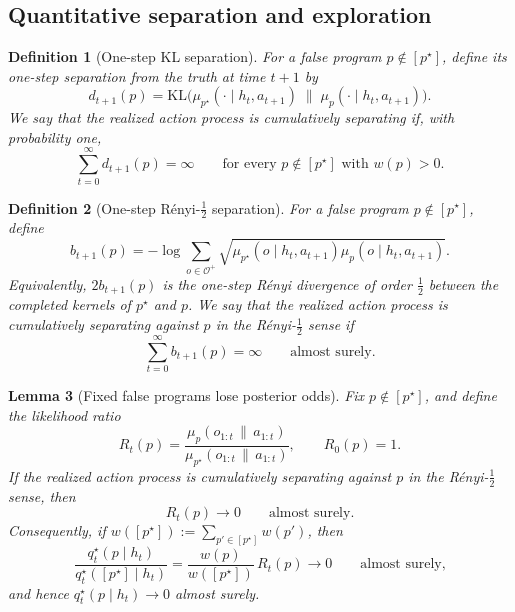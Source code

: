 \documentclass[11pt]{article}
\newtheorem{definition}{Definition}[section]
\newtheorem{lemma}[definition]{Lemma}
\theoremstyle{remark}
\newcommand{\Ocal}{\mathcal{O}}
\newcommand{\KL}{\mathrm{KL}}
\newcommand{\givena}{\,\|\,}
\begin{document}
\subsection{Quantitative separation and exploration}

\begin{definition}[One-step KL separation]
For a false program \(p \notin [p^\star]\), define its one-step separation from the truth at time \(t+1\) by
\[
d_{t+1}(p)
= \KL\bigl(
\mu_{p^\star}(\cdot\mid h_t,a_{t+1})
\;\|\;
\mu_p(\cdot\mid h_t,a_{t+1})
\bigr).
\]
We say that the realized action process is \emph{cumulatively separating} if, with probability one,
\[
\sum_{t=0}^{\infty} d_{t+1}(p) = \infty
\qquad\text{for every } p \notin [p^\star] \text{ with } w(p)>0.
\]
\end{definition}

\begin{definition}[One-step R\'enyi-\(\frac12\) separation]
\label{def:renyi-separation}
For a false program \(p \notin [p^\star]\), define
\[
b_{t+1}(p)
= -\log \sum_{o \in \Ocal^+}
\sqrt{
\mu_{p^\star}(o\mid h_t,a_{t+1})
\mu_p(o\mid h_t,a_{t+1})
}.
\]
Equivalently, \(2b_{t+1}(p)\) is the one-step R\'enyi divergence of order \(\frac12\) between the completed kernels of \(p^\star\) and \(p\). We say that the realized action process is \emph{cumulatively separating against \(p\) in the R\'enyi-\(\frac12\) sense} if
\[
\sum_{t=0}^{\infty} b_{t+1}(p) = \infty
\qquad\text{almost surely.}
\]
\end{definition}

\begin{lemma}[Fixed false programs lose posterior odds]
\label{lem:fixed-false-program}
Fix \(p \notin [p^\star]\), and define the likelihood ratio
\[
R_t(p)
= \frac{\mu_p(o_{1:t}\givena a_{1:t})}
{\mu_{p^\star}(o_{1:t}\givena a_{1:t})},
\qquad
R_0(p)=1.
\]
If the realized action process is cumulatively separating against \(p\) in the R\'enyi-\(\frac12\) sense, then
\[
R_t(p) \to 0
\qquad\text{almost surely.}
\]
Consequently, if \(w([p^\star]) := \sum_{p' \in [p^\star]} w(p')\), then
\[
\frac{q_t^\star(p\mid h_t)}{q_t^\star([p^\star]\mid h_t)}
= \frac{w(p)}{w([p^\star])}\,R_t(p)
\to 0
\qquad\text{almost surely,}
\]
and hence \(q_t^\star(p\mid h_t) \to 0\) almost surely.
\end{lemma}
\end{document}
